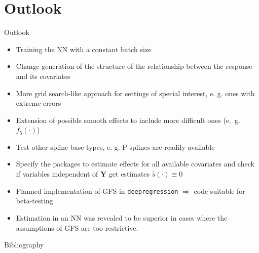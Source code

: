 \documentclass[xcolor=dvipsnames]{beamer}
\begin{document}
\section{Outlook}
\begin{frame}{Outlook}
  \begin{itemize}
    \item Training the \ac{NN} with a constant batch size
    \item Change generation of the structure of the relationship between the response and its covariates %
    \item More grid search-like approach for settings of special interest, e. g. ones with extreme errors
    \item Extension of possible smooth effects to include more difficult ones (e.~g. $f_5(\cdot)$)
    \item Test other spline base types, e. g. P-splines are readily available
    \item Specify the packages to estimate effects for all available covariates and check if variables independent of $\bm{Y}$ get estimates $\hat{s}(\cdot) \equiv 0$ %
    \item Planned implementation of \ac{GFS} in \texttt{deepregression} $\Rightarrow$ code suitable for beta-testing
    \item Estimation in an \ac{NN} was revealed to be superior in cases where the assumptions of \ac{GFS} are too restrictive.
  \end{itemize}
\end{frame}

\begin{frame}[allowframebreaks]{Bibliography}
  \printbibliography[heading=bibnumbered, title = Bibliography]
\end{frame}
\end{document}
